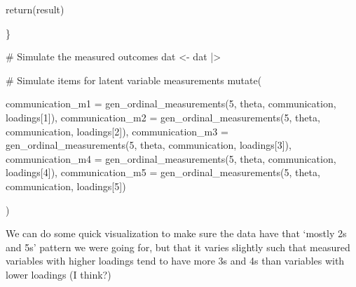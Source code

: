 \documentclass[
  letterpaper,
  DIV=11,
  numbers=noendperiod]{scrreprt}
\newenvironment{Shaded}{\begin{snugshade}}{\end{snugshade}}
\newcommand{\AttributeTok}[1]{\textcolor[rgb]{0.40,0.45,0.13}{#1}}
\newcommand{\CommentTok}[1]{\textcolor[rgb]{0.37,0.37,0.37}{#1}}
\newcommand{\DecValTok}[1]{\textcolor[rgb]{0.68,0.00,0.00}{#1}}
\newcommand{\FunctionTok}[1]{\textcolor[rgb]{0.28,0.35,0.67}{#1}}
\newcommand{\NormalTok}[1]{\textcolor[rgb]{0.00,0.23,0.31}{#1}}
\newcommand{\OtherTok}[1]{\textcolor[rgb]{0.00,0.23,0.31}{#1}}
\newcommand{\SpecialCharTok}[1]{\textcolor[rgb]{0.37,0.37,0.37}{#1}}
\newcommand{\StringTok}[1]{\textcolor[rgb]{0.13,0.47,0.30}{#1}}
\begin{document}
\begin{Shaded}
\begin{Highlighting}[]
   \FunctionTok{return}\NormalTok{(result)}
   
\NormalTok{\}}

\CommentTok{\# Simulate the measured outcomes}
\NormalTok{dat }\OtherTok{\textless{}{-}}\NormalTok{ dat }\SpecialCharTok{|\textgreater{}}

    \CommentTok{\# Simulate items for latent variable measurements}
    \FunctionTok{mutate}\NormalTok{(}

        \AttributeTok{communication\_m1 =} \FunctionTok{gen\_ordinal\_measurements}\NormalTok{(}\DecValTok{5}\NormalTok{, theta, communication, loadings[}\DecValTok{1}\NormalTok{]),}
        \AttributeTok{communication\_m2 =} \FunctionTok{gen\_ordinal\_measurements}\NormalTok{(}\DecValTok{5}\NormalTok{, theta, communication, loadings[}\DecValTok{2}\NormalTok{]),}
        \AttributeTok{communication\_m3 =} \FunctionTok{gen\_ordinal\_measurements}\NormalTok{(}\DecValTok{5}\NormalTok{, theta, communication, loadings[}\DecValTok{3}\NormalTok{]),}
        \AttributeTok{communication\_m4 =} \FunctionTok{gen\_ordinal\_measurements}\NormalTok{(}\DecValTok{5}\NormalTok{, theta, communication, loadings[}\DecValTok{4}\NormalTok{]),}
        \AttributeTok{communication\_m5 =} \FunctionTok{gen\_ordinal\_measurements}\NormalTok{(}\DecValTok{5}\NormalTok{, theta, communication, loadings[}\DecValTok{5}\NormalTok{])}

\NormalTok{    )}
\end{Highlighting}
\end{Shaded}

We can do some quick visualization to make sure the data have that
`mostly 2s and 5s' pattern we were going for, but that it varies
slightly such that measured variables with higher loadings tend to have
more 3s and 4s than variables with lower loadings (I think?)

\begin{Shaded}
\end{Shaded}
\end{document}
